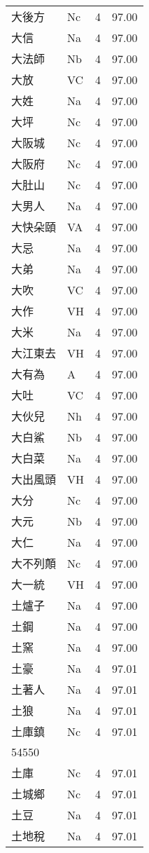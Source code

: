 \documentclass[twocolumn]{book}
\begin{document}
\begin{supertabular}{llrr}
大後方 & Nc & 4 &  97.00\\
大信 & Na & 4 &  97.00\\
大法師 & Nb & 4 &  97.00\\
大放 & VC & 4 &  97.00\\
大姓 & Na & 4 &  97.00\\
大坪 & Nc & 4 &  97.00\\
大阪城 & Nc & 4 &  97.00\\
大阪府 & Nc & 4 &  97.00\\
大肚山 & Nc & 4 &  97.00\\
大男人 & Na & 4 &  97.00\\
大快朵頤 & VA & 4 &  97.00\\
大忌 & Na & 4 &  97.00\\
大弟 & Na & 4 &  97.00\\
大吹 & VC & 4 &  97.00\\
大作 & VH & 4 &  97.00\\
大米 & Na & 4 &  97.00\\
大江東去 & VH & 4 &  97.00\\
大有為 & A & 4 &  97.00\\
大吐 & VC & 4 &  97.00\\
大伙兒 & Nh & 4 &  97.00\\
大白鯊 & Nb & 4 &  97.00\\
大白菜 & Na & 4 &  97.00\\
大出風頭 & VH & 4 &  97.00\\
大分 & Nc & 4 &  97.00\\
大元 & Nb & 4 &  97.00\\
大仁 & Na & 4 &  97.00\\
大不列顛 & Nc & 4 &  97.00\\
大一統 & VH & 4 &  97.00\\
土爐子 & Na & 4 &  97.00\\
土鋼 & Na & 4 &  97.00\\
土窯 & Na & 4 &  97.00\\
土豪 & Na & 4 &  97.01\\
土著人 & Na & 4 &  97.01\\
土狼 & Na & 4 &  97.01\\
土庫鎮 & Nc & 4 &  97.01\\
54550\\
土庫 & Nc & 4 &  97.01\\
土城鄉 & Nc & 4 &  97.01\\
土豆 & Na & 4 &  97.01\\
土地稅 & Na & 4 &  97.01\\

\end{supertabular}
\end{document}
